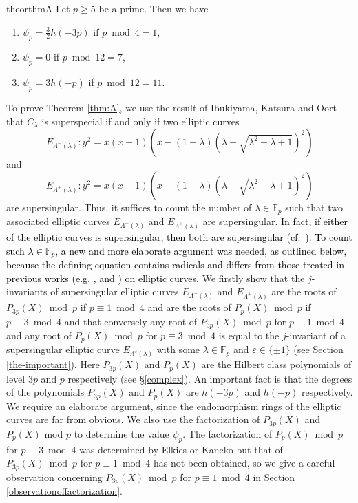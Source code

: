 \documentclass[a4paper, 11pt]{article}
\theoremstyle{plain}
\newcommand{\?}{\textcolor{red}{??}}
\newcommand{\lm}{\lambda}
\newcommand{\Lm}{\Lambda}
\newcommand{\fp}{\mathbb{F}_p}
\begin{document}
\begin{restatable}{theor}{thmA} \label{thm:A}
     Let $p\ge 5$ be a prime. Then we have 
    \begin{enumerate}
        \item [] ${\psi}_{p}=\frac{3}{2}h(-3p)$ if $p \bmod 4=1$,
        \item [] ${\psi}_{p}=0$ if  $p \bmod 12=7$,
        \item [] ${\psi}_{p}=3h(-p)$ if $p \bmod 12=11$.
    \end{enumerate}
\end{restatable}
To prove Theorem \ref{thm:A}, we use the result of Ibukiyama, Katsura and Oort \cite[\S 1.2]{IKO02} that $C_{\lm}$ is superspecial if and only if two elliptic curves 
 \begin{equation*}\label{eq:E_Lambda}
     E_{{\Lm}^{-}(\lm)}:y^2=x(x-1)\left(x-(1-\lambda)(\lm - \sqrt{{\lambda}^2-\lambda+1})^2 \right)
 \end{equation*}
 and 
\begin{equation*}\label{eq:E_LambdaPrime}
 E_{{\Lm}^{+}(\lm)}:y^2=x(x-1)\left(x-(1-\lambda)(\lm +\sqrt{{\lambda}^2-\lambda+1})^2 \right)
 \end{equation*}
 are supersingular. 
  Thus, it suffices to count the number of $\lambda \in \fp$ such that two associated elliptic curves $E_{\Lm^{-}(\lm)}$ and $ E_{{\Lm}^{+}(\lm)}$ are supersingular. \textcolor{black}{In fact, if either of the elliptic curves is supersingular, then both are supersingular (cf.\ \cite[Proposition 1.10]{IKO02}).  
To count such $\lm\in\fp$, a new and more elaborate argument was needed, as outlined below, because the defining equation contains radicals and differs from those treated in previous works (e.g. \cite{AT02}, \cite{Ando} and \cite{FM01}) on elliptic curves.}
 We firstly show that the $j$-invariants of supersingular elliptic curves $E_{\Lm^{-}(\lm)}$ and $ E_{{\Lm}^{+}(\lm)}$ are the roots of $P_{3p}(X) \bmod p$ if $p \equiv1 \bmod 4$ and are the roots of $P_{p}(X) \bmod p$ if $p \equiv3 \bmod 4$ and that conversely any root of $P_{3p}(X) \bmod p$ for $p \equiv1 \bmod4$ and any root of $P_{p}(X)\bmod p$ for $p \equiv3 \bmod 4$ is equal to the $j$-invariant of a supersingular elliptic curve $E_{\Lm^{\varepsilon}(\lm)}$ with some $\lm \in \fp$ and $\varepsilon\in\{\pm1\}$ (see Section \ref{the-important}). Here $P_{3p}(X)$ and $P_p(X)$ are the Hilbert class polynomials of level $3p$ and $p$ respectively (see \S \ref{complex}). An important fact is that the degrees of the polynomials $P_{3p}(X)$ and $P_p(X)$ are $h(-3p)$ and $h(-p)$ respectively.  We require an elaborate argument, since the endomorphism rings of the elliptic curves are far from obvious. 
 We also use the factorization of $P_{3p}(X)$ and $P_p(X)$ mod $p$ to 
 determine the value $\psi_p$. The factorization of $P_p(X) \bmod p$ for $p \equiv3\bmod4$ was determined by Elkies \cite{Elkies} or Kaneko \cite[Appendix]{kaneko} but that of $P_{3p}(X) \bmod p $ for $p\equiv1 \bmod 4$ has not been obtained, so we give a careful observation concerning $P_{3p}(X) \bmod p$ for $p \equiv1 \bmod 4$ in Section \ref{observationoffactorization}.
\end{document}

